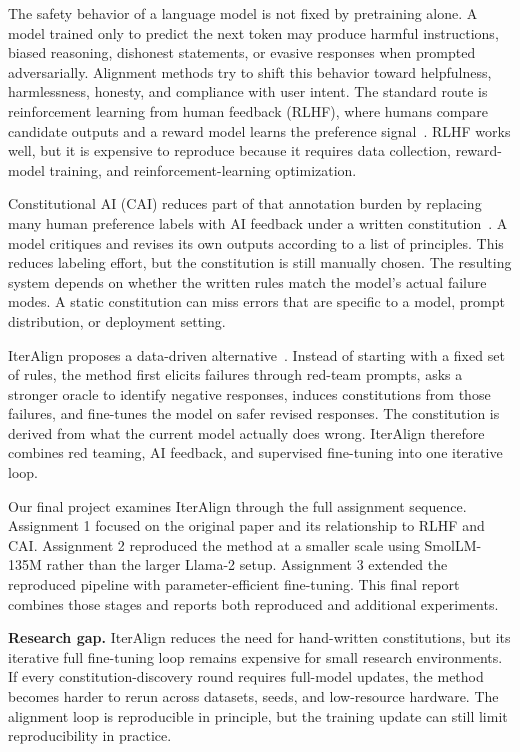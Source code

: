 \documentclass[10pt,twocolumn]{article}
\newcommand{\modelname}{SmolLM-135M}
\begin{document}
The safety behavior of a language model is not fixed by pretraining alone. A model trained only to predict the next token may produce harmful instructions, biased reasoning, dishonest statements, or evasive responses when prompted adversarially. Alignment methods try to shift this behavior toward helpfulness, harmlessness, honesty, and compliance with user intent. The standard route is reinforcement learning from human feedback (RLHF), where humans compare candidate outputs and a reward model learns the preference signal~\cite{ouyang2022instructgpt}. RLHF works well, but it is expensive to reproduce because it requires data collection, reward-model training, and reinforcement-learning optimization.

Constitutional AI (CAI) reduces part of that annotation burden by replacing many human preference labels with AI feedback under a written constitution~\cite{bai2022cai}. A model critiques and revises its own outputs according to a list of principles. This reduces labeling effort, but the constitution is still manually chosen. The resulting system depends on whether the written rules match the model's actual failure modes. A static constitution can miss errors that are specific to a model, prompt distribution, or deployment setting.

IterAlign proposes a data-driven alternative~\cite{chen2024iteralign}. Instead of starting with a fixed set of rules, the method first elicits failures through red-team prompts, asks a stronger oracle to identify negative responses, induces constitutions from those failures, and fine-tunes the model on safer revised responses. The constitution is derived from what the current model actually does wrong. IterAlign therefore combines red teaming, AI feedback, and supervised fine-tuning into one iterative loop.

Our final project examines IterAlign through the full assignment sequence. Assignment 1 focused on the original paper and its relationship to RLHF and CAI. Assignment 2 reproduced the method at a smaller scale using \modelname{} rather than the larger Llama-2 setup. Assignment 3 extended the reproduced pipeline with parameter-efficient fine-tuning. This final report combines those stages and reports both reproduced and additional experiments.

\textbf{Research gap.} IterAlign reduces the need for hand-written constitutions, but its iterative full fine-tuning loop remains expensive for small research environments. If every constitution-discovery round requires full-model updates, the method becomes harder to rerun across datasets, seeds, and low-resource hardware. The alignment loop is reproducible in principle, but the training update can still limit reproducibility in practice.
\end{document}
